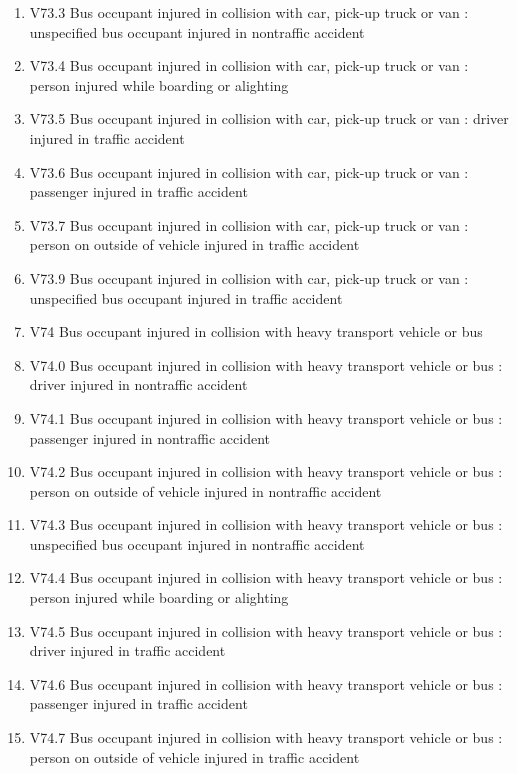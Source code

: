 \documentclass[
]{scrartcl}
\begin{document}
\begin{itemize}
\begin{enumerate}
  \item
    V73.3 Bus occupant injured in collision with car, pick-up truck or
    van : unspecified bus occupant injured in nontraffic accident
  \item
    V73.4 Bus occupant injured in collision with car, pick-up truck or
    van : person injured while boarding or alighting
  \item
    V73.5 Bus occupant injured in collision with car, pick-up truck or
    van : driver injured in traffic accident
  \item
    V73.6 Bus occupant injured in collision with car, pick-up truck or
    van : passenger injured in traffic accident
  \item
    V73.7 Bus occupant injured in collision with car, pick-up truck or
    van : person on outside of vehicle injured in traffic accident
  \item
    V73.9 Bus occupant injured in collision with car, pick-up truck or
    van : unspecified bus occupant injured in traffic accident
  \item
    V74 Bus occupant injured in collision with heavy transport vehicle
    or bus
  \item
    V74.0 Bus occupant injured in collision with heavy transport vehicle
    or bus : driver injured in nontraffic accident
  \item
    V74.1 Bus occupant injured in collision with heavy transport vehicle
    or bus : passenger injured in nontraffic accident
  \item
    V74.2 Bus occupant injured in collision with heavy transport vehicle
    or bus : person on outside of vehicle injured in nontraffic accident
  \item
    V74.3 Bus occupant injured in collision with heavy transport vehicle
    or bus : unspecified bus occupant injured in nontraffic accident
  \item
    V74.4 Bus occupant injured in collision with heavy transport vehicle
    or bus : person injured while boarding or alighting
  \item
    V74.5 Bus occupant injured in collision with heavy transport vehicle
    or bus : driver injured in traffic accident
  \item
    V74.6 Bus occupant injured in collision with heavy transport vehicle
    or bus : passenger injured in traffic accident
  \item
    V74.7 Bus occupant injured in collision with heavy transport vehicle
    or bus : person on outside of vehicle injured in traffic accident

\end{enumerate}
\end{itemize}
\end{document}
